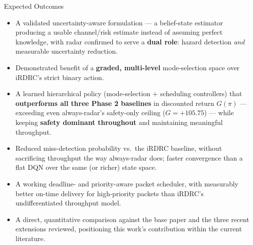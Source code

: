 \documentclass[aspectratio=169]{beamer}
\begin{document}
\begin{frame}{Expected Outcomes}
  \footnotesize
  \begin{itemize}
    \setlength{\itemsep}{0.05cm}
    \item A validated uncertainty-aware formulation --- a belief-state estimator producing a usable channel/risk estimate instead of assuming perfect knowledge, with radar confirmed to serve a \textbf{dual role}: hazard detection \emph{and} measurable uncertainty reduction.
    \item Demonstrated benefit of a \textbf{graded, multi-level} mode-selection space over iRDRC's strict binary action.
    \item A learned hierarchical policy (mode-selection + scheduling controllers) that \textbf{outperforms all three Phase 2 baselines} in discounted return $G(\pi)$ --- exceeding even always-radar's safety-only ceiling ($G = +105.75$) --- while keeping \textbf{safety dominant throughout} and maintaining meaningful throughput.
    \item Reduced miss-detection probability vs.\ the iRDRC baseline, without sacrificing throughput the way always-radar does; faster convergence than a flat DQN over the same (or richer) state space.
    \item A working deadline- and priority-aware packet scheduler, with measurably better on-time delivery for high-priority packets than iRDRC's undifferentiated throughput model.
    \item A direct, quantitative comparison against the base paper and the three recent extensions reviewed, positioning this work's contribution within the current literature.
  \end{itemize}
\end{frame}
\end{document}
